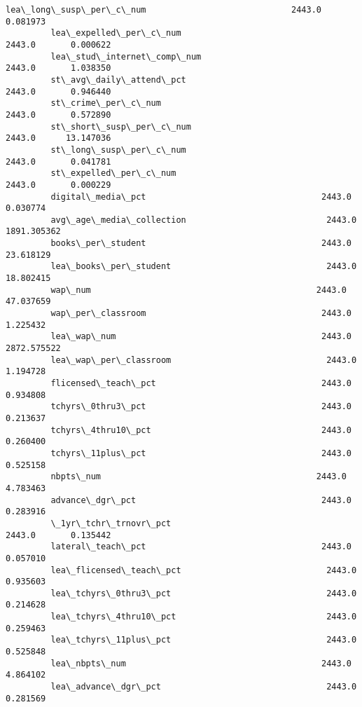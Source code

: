 \documentclass[11pt]{article}
\begin{document}
\begin{Verbatim}[commandchars=\\\{\}]
         lea\_long\_susp\_per\_c\_num                             2443.0       0.081973   
         lea\_expelled\_per\_c\_num                              2443.0       0.000622   
         lea\_stud\_internet\_comp\_num                          2443.0       1.038350   
         st\_avg\_daily\_attend\_pct                             2443.0       0.946440   
         st\_crime\_per\_c\_num                                  2443.0       0.572890   
         st\_short\_susp\_per\_c\_num                             2443.0      13.147036   
         st\_long\_susp\_per\_c\_num                              2443.0       0.041781   
         st\_expelled\_per\_c\_num                               2443.0       0.000229   
         digital\_media\_pct                                   2443.0       0.030774   
         avg\_age\_media\_collection                            2443.0    1891.305362   
         books\_per\_student                                   2443.0      23.618129   
         lea\_books\_per\_student                               2443.0      18.802415   
         wap\_num                                             2443.0      47.037659   
         wap\_per\_classroom                                   2443.0       1.225432   
         lea\_wap\_num                                         2443.0    2872.575522   
         lea\_wap\_per\_classroom                               2443.0       1.194728   
         flicensed\_teach\_pct                                 2443.0       0.934808   
         tchyrs\_0thru3\_pct                                   2443.0       0.213637   
         tchyrs\_4thru10\_pct                                  2443.0       0.260400   
         tchyrs\_11plus\_pct                                   2443.0       0.525158   
         nbpts\_num                                           2443.0       4.783463   
         advance\_dgr\_pct                                     2443.0       0.283916   
         \_1yr\_tchr\_trnovr\_pct                                2443.0       0.135442   
         lateral\_teach\_pct                                   2443.0       0.057010   
         lea\_flicensed\_teach\_pct                             2443.0       0.935603   
         lea\_tchyrs\_0thru3\_pct                               2443.0       0.214628   
         lea\_tchyrs\_4thru10\_pct                              2443.0       0.259463   
         lea\_tchyrs\_11plus\_pct                               2443.0       0.525848   
         lea\_nbpts\_num                                       2443.0       4.864102   
         lea\_advance\_dgr\_pct                                 2443.0       0.281569   

\end{Verbatim}
\end{document}
